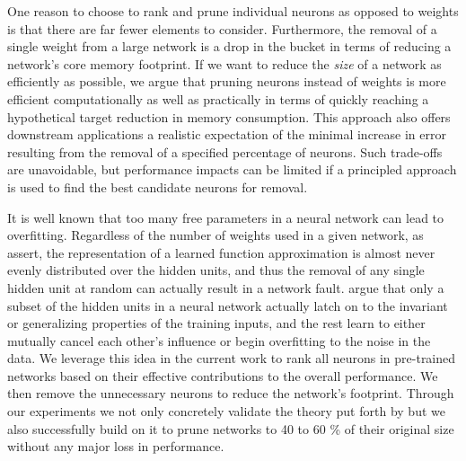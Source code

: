One reason to choose to rank and prune individual neurons as opposed to weights is that there are far fewer elements to consider. Furthermore, the removal of a single weight from a large network is a drop in the bucket in terms of reducing a network's core memory footprint. If we want to reduce the \textit{size} of a network as efficiently as possible, we argue that pruning neurons instead of weights is more efficient computationally as well as practically in terms of quickly reaching a hypothetical target reduction in memory consumption. This approach also offers downstream applications a realistic expectation of the minimal increase in error resulting from the removal of a specified percentage of neurons. Such trade-offs are unavoidable, but performance impacts can be limited if a principled approach is used to find the best candidate neurons for removal. 

It is well known that too many free parameters in a neural network can lead to overfitting. Regardless of the number of weights used in a given network, as \cite{segee1991fault} assert, the representation of a learned function approximation is almost never evenly distributed over the hidden units, and thus the removal of any single hidden unit at random can actually result in a network fault. \cite{mozer1989using} argue that only a subset of the hidden units in a neural network actually latch on to the invariant or generalizing properties of the training inputs, and the rest learn to either mutually cancel each other's influence or begin overfitting to the noise in the data. We leverage this idea in the current work to rank all neurons in pre-trained networks based on their effective contributions to the overall performance. We then remove the unnecessary neurons to reduce the network's footprint. Through our experiments we not only concretely validate the theory put forth by \cite{mozer1989using} but we also successfully build on  it to prune networks to 40 to 60 \% of their original size without any major loss in performance.
